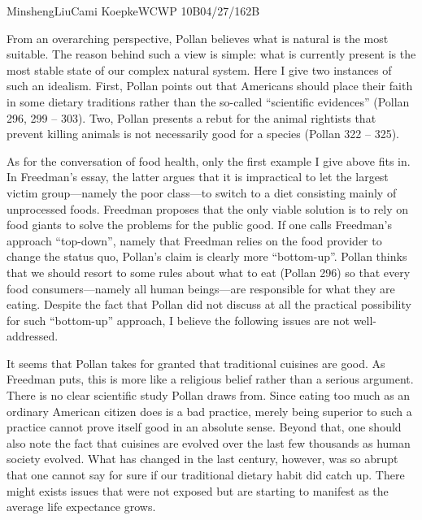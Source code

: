 \documentclass[12pt,letterpaper]{article}
\begin{document}
\begin{mla}{Minsheng}{Liu}{Cami Koepke}{WCWP 10B}{04/27/16}{2B}

From an overarching perspective, Pollan believes what is natural is the
most suitable. The reason behind such a view is simple: what is
currently present is the most stable state of our complex natural
system. Here I give two instances of such an idealism. First, Pollan
points out that Americans should place their faith in some dietary
traditions rather than the so-called ``scientific evidences'' (Pollan
296, 299 -- 303). Two, Pollan presents a rebut for the animal rightists
that prevent killing animals is not necessarily good for a species
(Pollan 322 -- 325).

As for the conversation of food health, only the first example I give
above fits in. In Freedman's essay, the latter argues that it is
impractical to let the largest victim group---namely the poor class---to
switch to a diet consisting mainly of unprocessed foods. Freedman
proposes that the only viable solution is to rely on food giants to
solve the problems for the public good. If one calls Freedman's approach
``top-down'', namely that Freedman relies on the food provider to change
the status quo, Pollan's claim is clearly more ``bottom-up''. Pollan
thinks that we should resort to some rules about what to eat (Pollan
296) so that every food consumers---namely all human beings---are
responsible for what they are eating. Despite the fact that Pollan did
not discuss at all the practical possibility for such ``bottom-up''
approach, I believe the following issues are not well-addressed.

It seems that Pollan takes for granted that traditional cuisines are
good. As Freedman puts, this is more like a religious belief rather than
a serious argument. There is no clear scientific study Pollan draws
from. Since eating too much as an ordinary American citizen does is a
bad practice, merely being superior to such a practice cannot prove
itself good in an absolute sense. Beyond that, one should also note the
fact that cuisines are evolved over the last few thousands as human
society evolved. What has changed in the last century, however, was so
abrupt that one cannot say for sure if our traditional dietary habit did
catch up. There might exists issues that were not exposed but are
starting to manifest as the average life expectance grows.


\end{mla}
\end{document}
